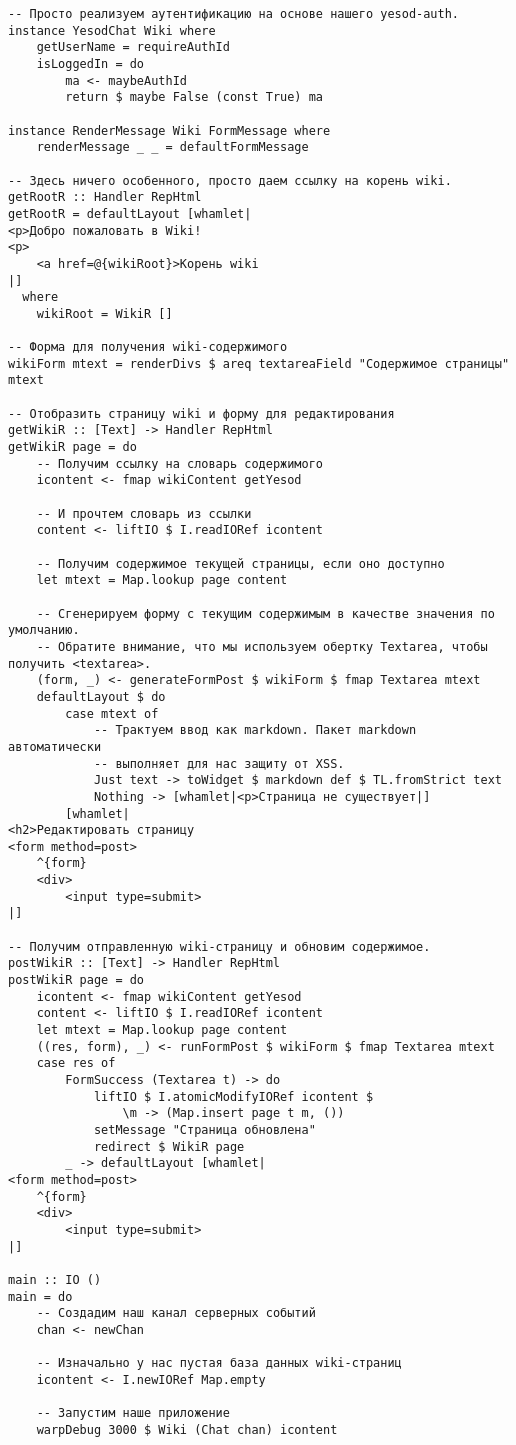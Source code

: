 \begin{lstlisting}
-- Просто реализуем аутентификацию на основе нашего yesod-auth.
instance YesodChat Wiki where
    getUserName = requireAuthId
    isLoggedIn = do
        ma <- maybeAuthId
        return $ maybe False (const True) ma

instance RenderMessage Wiki FormMessage where
    renderMessage _ _ = defaultFormMessage

-- Здесь ничего особенного, просто даем ссылку на корень wiki.
getRootR :: Handler RepHtml
getRootR = defaultLayout [whamlet|
<p>Добро пожаловать в Wiki!
<p>
    <a href=@{wikiRoot}>Корень wiki
|]
  where
    wikiRoot = WikiR []

-- Форма для получения wiki-содержимого
wikiForm mtext = renderDivs $ areq textareaField "Содержимое страницы" mtext

-- Отобразить страницу wiki и форму для редактирования
getWikiR :: [Text] -> Handler RepHtml
getWikiR page = do
    -- Получим ссылку на словарь содержимого
    icontent <- fmap wikiContent getYesod

    -- И прочтем словарь из ссылки
    content <- liftIO $ I.readIORef icontent

    -- Получим содержимое текущей страницы, если оно доступно
    let mtext = Map.lookup page content

    -- Сгенерируем форму с текущим содержимым в качестве значения по умолчанию.
    -- Обратите внимание, что мы используем обертку Textarea, чтобы получить <textarea>.
    (form, _) <- generateFormPost $ wikiForm $ fmap Textarea mtext
    defaultLayout $ do
        case mtext of
            -- Трактуем ввод как markdown. Пакет markdown автоматически
            -- выполняет для нас защиту от XSS.
            Just text -> toWidget $ markdown def $ TL.fromStrict text
            Nothing -> [whamlet|<p>Страница не существует|]
        [whamlet|
<h2>Редактировать страницу
<form method=post>
    ^{form}
    <div>
        <input type=submit>
|]

-- Получим отправленную wiki-страницу и обновим содержимое.
postWikiR :: [Text] -> Handler RepHtml
postWikiR page = do
    icontent <- fmap wikiContent getYesod
    content <- liftIO $ I.readIORef icontent
    let mtext = Map.lookup page content
    ((res, form), _) <- runFormPost $ wikiForm $ fmap Textarea mtext
    case res of
        FormSuccess (Textarea t) -> do
            liftIO $ I.atomicModifyIORef icontent $
                \m -> (Map.insert page t m, ())
            setMessage "Страница обновлена"
            redirect $ WikiR page
        _ -> defaultLayout [whamlet|
<form method=post>
    ^{form}
    <div>
        <input type=submit>
|]

main :: IO ()
main = do
    -- Создадим наш канал серверных событий
    chan <- newChan

    -- Изначально у нас пустая база данных wiki-страниц
    icontent <- I.newIORef Map.empty

    -- Запустим наше приложение
    warpDebug 3000 $ Wiki (Chat chan) icontent
\end{lstlisting}
